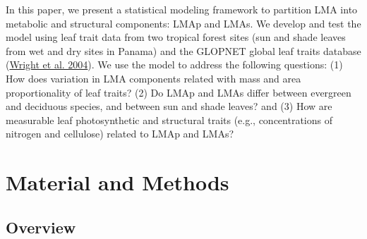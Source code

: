 \documentclass[
  12pt,
  a4paper,
,tablecaptionabove
]{scrartcl}
\begin{document}
In this paper, we present a statistical modeling framework to partition LMA into metabolic and structural components: LMAp and LMAs.
We develop and test the model using leaf trait data from two tropical forest sites (sun and shade leaves from wet and dry sites in Panama) and the GLOPNET global leaf traits database (\protect\hyperlink{ref-Wright2004a}{Wright et al. 2004}).
We use the model to address the following questions: (1) How does variation in LMA components related with mass and area proportionality of leaf traits? (2) Do LMAp and LMAs differ between evergreen and deciduous species, and between sun and shade leaves? and (3) How are measurable leaf photosynthetic and structural traits (e.g., concentrations of nitrogen and cellulose) related to LMAp and LMAs?

\hypertarget{material-and-methods}{%
\section{Material and Methods}\label{material-and-methods}}

\hypertarget{overview}{%
\subsection{Overview}\label{overview}}
\end{document}
